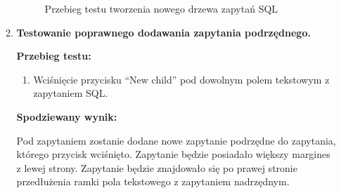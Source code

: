 \begin{enumerate}
\begin{enumerate}
\begin{figure}[h]

                    \caption{Przebieg testu tworzenia nowego drzewa zapytań SQL}
                    \label{creatingNewTreeManualTest}
                \end{figure}

                \FloatBarrier

            \item \textbf{Testowanie poprawnego dodawania zapytania podrzędnego.}

                \textbf{Przebieg testu:}

                \begin{enumerate}

                    \item Wciśnięcie przycisku ``New child'' pod dowolnym polem
                        tekstowym z zapytaniem SQL.

                \end{enumerate}

                \textbf{Spodziewany wynik:}

                Pod zapytaniem zostanie dodane nowe zapytanie podrzędne do
                zapytania, którego przycisk wciśnięto. Zapytanie będzie
                posiadało większy margines z lewej strony. Zapytanie będzie
                znajdowało się po prawej stronie przedłużenia ramki pola
                tekstowego z zapytaniem nadrzędnym.


\end{enumerate}
\end{enumerate}

